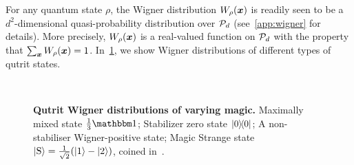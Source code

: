 \documentclass[pra,
aps,
twocolumn,
superscriptaddress,
groupedaddress,
nofootinbib,
reprint
]{revtex4-1}
\begin{document}
For any quantum state $\rho$, the Wigner distribution $W_\rho(\bmx)$ is readily seen to be a $d^2$-dimensional quasi-probability distribution over $\cal{P}_d$ (see~\cref{app:wigner} for details). More precisely, $W_\rho(\x)$ is a real-valued function on $\P_d$ with the property that $\sum_{\x} W_\rho(\bmx) = 1$.  In~\cref{fig:wstate_examples}, we show Wigner distributions of different types of qutrit states.


\begin{figure}%
    \centering
    \hspace{8pt}%
    \\
    \hspace{8pt}%
    \caption{\textbf{Qutrit Wigner distributions of varying magic.} 
     Maximally mixed state $\frac{1}{3}\id$;  Stabilizer zero state $\ketbra{0}{0}$;  A non-stabiliser Wigner-positive state;  Magic Strange state $\ket{{\rm{S}}} = \frac{1}{\sqrt{2}}(\ket{1} - \ket{2})$, coined in~\cite{cit:veitch2}.
    }%
    \label{fig:wstate_examples}
\end{figure}
\end{document}
